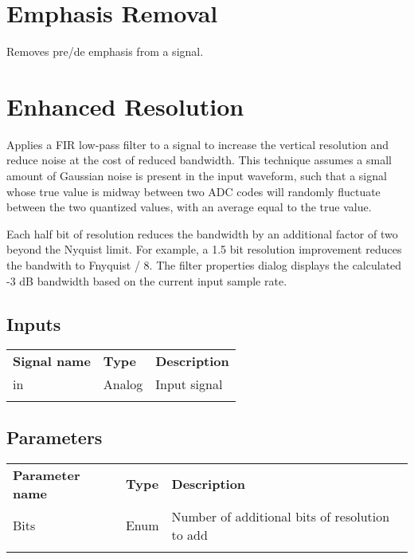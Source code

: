 \section{Emphasis Removal}

Removes pre/de emphasis from a signal.

\pagebreak
\section{Enhanced Resolution}
\label{filter:eres}

Applies a FIR low-pass filter to a signal to increase the vertical resolution and reduce noise at the cost of reduced
bandwidth. This technique assumes a small amount of Gaussian noise is present in the input waveform, such that a signal
whose true value is midway between two ADC codes will randomly fluctuate between the two quantized values, with an
average equal to the true value.

Each half bit of resolution reduces the bandwidth by an additional factor of two beyond the Nyquist limit. For example,
a 1.5 bit resolution improvement reduces the bandwith to Fnyquist / 8. The filter properties dialog displays the
calculated -3 dB bandwidth based on the current input sample rate.

\subsection{Inputs}

\begin{tabularx}{16cm}{llX}
\thickhline
\textbf{Signal name} & \textbf{Type} & \textbf{Description} \\
\thickhline
in & Analog & Input signal\\
\thickhline
\end{tabularx}

\subsection{Parameters}

\begin{tabularx}{16cm}{llX}
\thickhline
\textbf{Parameter name} & \textbf{Type} & \textbf{Description} \\
\thickhline
Bits & Enum & Number of additional bits of resolution to add\\
\thickhline
\end{tabularx}

